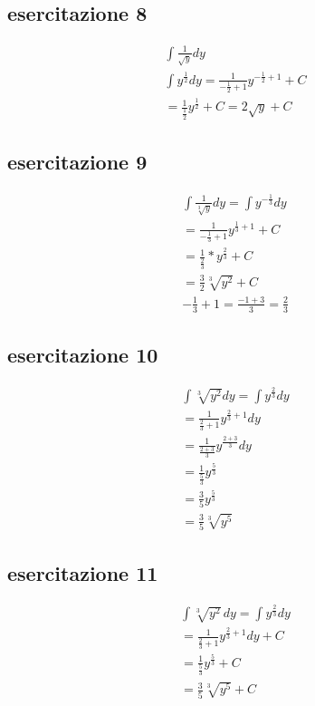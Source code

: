 \subsection{esercitazione 8}
	\begin{equation}
		\begin{matrix}
			\int \frac{1}{\sqrt{y}}dy\\
			\int
			y^{\frac{1}{2}}dy=\frac{1}{-\frac{1}{2}+1}y^{-\frac{1}{2}+1}+C\\
			=\frac{1}{\frac{1}{2}}y^\frac{1}{2}+C=2\sqrt{y}+C
		\end{matrix}
	\end{equation}
\subsection{esercitazione 9}
	\begin{equation}
		\begin{matrix}
			\int \frac{1}{\sqrt[3]{y}}dy=\int y^{-\frac{1}{3}}dy\\
			=\frac{1}{-\frac{1}{3}+1}y^{\frac{1}{3}+1}+C\\
			=\frac{1}{\frac{2}{3}}*y^{\frac{2}{3}}+C\\
			=\frac{3}{2}\sqrt[3]{y^2}+C\\
			-\frac{1}{3}+1=\frac{-1+3}{3}=\frac{2}{3}
		\end{matrix}
	\end{equation}
\subsection{esercitazione 10}
	\begin{equation}
		\begin{matrix}
			\int \sqrt[3]{y^2}dy=\int y^{\frac{2}{3}}dy\\
			=\frac{1}{\frac{2}{3}+1}y^{\frac{2}{3}+1}dy\\
			=\frac{1}{\frac{2+3}{3}}y^{\frac{2+3}{3}}dy\\
			=\frac{1}{\frac{5}{3}}y^{\frac{5}{3}}\\
			=\frac{3}{5}y^\frac{5}{3}\\
			=\frac{3}{5}\sqrt[3]{y^5}
		\end{matrix}
	\end{equation}
\subsection{esercitazione 11}
	\begin{equation}
		\begin{matrix}
			\int \sqrt[3]{y^2}\,dy=\int
			y^{\frac{2}{3}}dy\\
			=\frac{1}{\frac{2}{3}+1}y^{\frac{2}{3}+1}dy+C\\
			=\frac{1}{\frac{5}{3}}y^{\frac{5}{3}}+C\\
			=\frac{3}{5}\sqrt[3]{y^5}+C
		\end{matrix}
	\end{equation}
